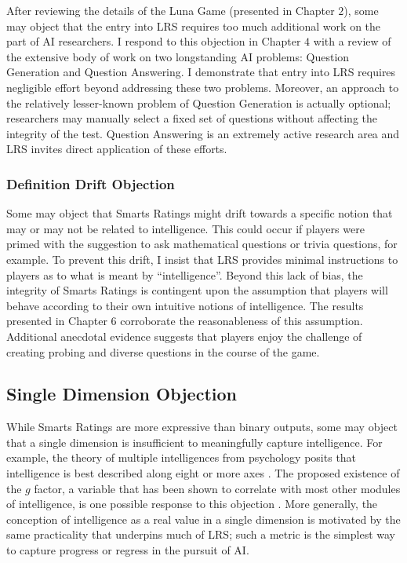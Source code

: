 After reviewing the details of the Luna Game (presented in Chapter $2$), some may object that the entry into LRS requires too much additional work on the part of AI researchers. I respond to this objection in Chapter $4$ with a review of the extensive body of work on two longstanding AI problems: Question Generation and Question Answering. I demonstrate that entry into LRS requires negligible effort beyond addressing these two problems. Moreover, an approach to the relatively lesser-known problem of Question Generation is actually optional; researchers may manually select a fixed set of questions without affecting the integrity of the test. Question Answering is an extremely active research area and LRS invites direct application of these efforts.

\subsubsection{Definition Drift Objection}

Some may object that Smarts Ratings might drift towards a specific notion that may or may not be related to intelligence. This could occur if players were primed with the suggestion to ask mathematical questions or trivia questions, for example. To prevent this drift, I insist that LRS provides minimal instructions to players as to what is meant by ``intelligence''. Beyond this lack of bias, the integrity of Smarts Ratings is contingent upon the assumption that players will behave according to their own intuitive notions of intelligence. The results presented in Chapter $6$ corroborate the reasonableness of this assumption. Additional anecdotal evidence suggests that players enjoy the challenge of creating probing and diverse questions in the course of the game.

\subsection{Single Dimension Objection}

While Smarts Ratings are more expressive than binary outputs, some may object that a single dimension is insufficient to meaningfully capture intelligence. For example, the theory of multiple intelligences from psychology posits that intelligence is best described along eight or more axes \citep{gardner2011frames}. The proposed existence of the $g$ factor, a variable that has been shown to correlate with most other modules of intelligence, is one possible response to this objection  \citep{visser2006g}. More generally, the conception of intelligence as a real value in a single dimension is motivated by the same practicality that underpins much of LRS; such a metric is the simplest way to capture progress or regress in the pursuit of AI.


